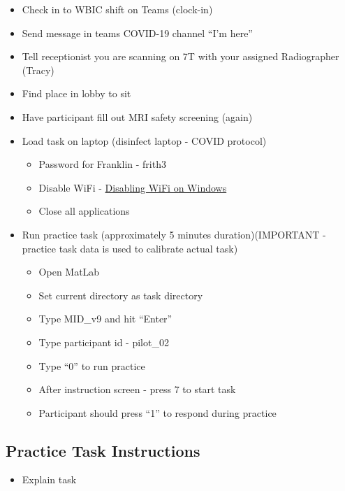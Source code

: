 \documentclass[
]{book}
\providecommand{\tightlist}{%
  \setlength{\itemsep}{0pt}\setlength{\parskip}{0pt}}
\begin{document}
\begin{itemize}
\item
  Check in to WBIC shift on Teams (clock-in)
\item
  Send message in teams COVID-19 channel ``I'm here''
\item
  Tell receptionist you are scanning on 7T with your assigned Radiographer (Tracy)
\item
  Find place in lobby to sit
\item
  Have participant fill out MRI safety screening (again)
\item
  Load task on laptop (disinfect laptop - COVID protocol)

  \begin{itemize}
  \tightlist
  \item
    Password for Franklin - frith3
  \item
    Disable WiFi - \protect\hyperlink{disabling-wifi-on-windows}{Disabling WiFi on Windows}
  \item
    Close all applications
  \end{itemize}
\item
  Run practice task (approximately 5 minutes duration)(IMPORTANT - practice task data is used to calibrate actual task)

  \begin{itemize}
  \tightlist
  \item
    Open MatLab
  \item
    Set current directory as task directory
  \item
    Type MID\_v9 and hit ``Enter''
  \item
    Type participant id - pilot\_02
  \item
    Type ``0'' to run practice
  \item
    After instruction screen - press 7 to start task
  \item
    Participant should press ``1'' to respond during practice
  \end{itemize}
\end{itemize}

\hypertarget{practice-task-instructions}{%
\subsection{Practice Task Instructions}\label{practice-task-instructions}}

\begin{itemize}
\tightlist
\item
  Explain task
\end{itemize}
\end{document}
